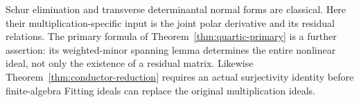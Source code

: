 \begin{remark}\label{rem:formalism-versus-classification}
Schur elimination and transverse determinantal normal forms are
classical. Here their multiplication-specific input is the joint
polar derivative and its residual relations. The primary formula
of Theorem~\ref{thm:quartic-primary} is a further assertion: its
weighted-minor spanning lemma determines the entire nonlinear ideal,
not only the existence of a residual matrix. Likewise
Theorem~\ref{thm:conductor-reduction} requires an actual surjectivity
identity before finite-algebra Fitting ideals can replace the
original multiplication ideals.
\end{remark}
